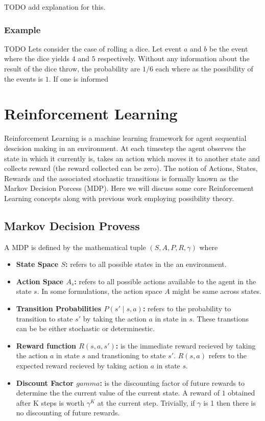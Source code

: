 \documentclass[12pt,a4paper]{report}
\begin{document}
TODO add explanation for this. 

\subsubsection{Example}
TODO 
Lets consider the case of rolling a dice. Let event $a$ and $b$ be the event where the dice yields $4$ and $5$ respectively. Without any information about the result of the dice throw, the probability are $1/6$ each where as the possibility of the events is $1$. If one is informed 
\section{Reinforcement Learning}

Reinforcement Learning is a machine learning framework for agent sequential descision making in an environment. At each timestep the agent observes the state in which it currently is, takes an action which moves it to another state and collects reward (the reward collected can be zero). The notion of Actions, States, Rewards and the associated stochastic transitions is formally known as the Markov Decision Porcess (MDP). Here we will discuss some core Reinforcement Learning concepts along with previous work employing possibility theory. 

\subsection{Markov Decision Provess}

A MDP is defined by the mathematical tuple $(S, A, P, R, \gamma)$ where 
\begin{itemize}
  \item \textbf{State Space $S$:} refers to all possible states in the an environment.  
  \item \textbf{Action Space $A_s$:}  refers to all possible actions available to the agent in the state $s$. In some formulations, the action space $A$ might be same across states. 
  \item \textbf{Transition Probabilities $P(s' \mid s, a)$:}  refers to the probability to transition to state $s'$ by taking the action $a$ in state in $s$. These transtions can be be either stochastic or determinestic.   
  \item \textbf{Reward function $R(s, a, s')$:} is the immediate reward recieved by taking the action $a$ in state $s$ and transtioning to state $s'$. $R(s, a)$ refers to the expected reward recieved by taking action $a$ in state $s$.  
  \item \textbf{Discount Factor $gamma$:} is the discounting factor of future rewards to determine the the current value of the current state. A reward of $1$ obtained after K steps is worth $\gamma ^ K$ at the current step. Trivially, if $\gamma$ is 1 then there is no discounting of future rewards.    
\end{itemize}
 
\end{document}
